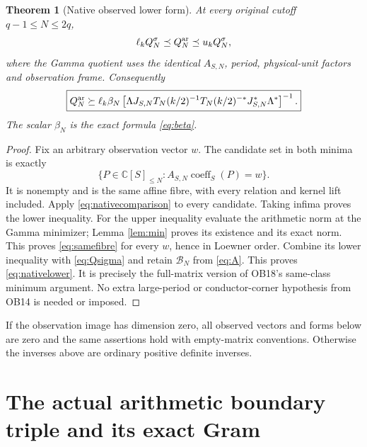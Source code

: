 \documentclass[11pt]{article}
\newtheorem{theorem}{Theorem}
\newcommand{\C}{\mathbb C}
\begin{document}
\begin{theorem}[Native observed lower form]\label{thm:nativelower}
At every original cutoff $q-1\le N\le2q$,
\begin{equation}\label{eq:samefibre}
 \ell_kQ_N^\sigma\preceq Q_N^{\rm ar}\preceq u_kQ_N^\sigma,
\end{equation}
where the Gamma quotient uses the identical $A_{S,N}$, period,
physical-unit factors and observation frame.  Consequently
\begin{equation}\label{eq:nativelower}
 \boxed{Q_N^{\rm ar}\succeq
 \ell_k\beta_N\left[
 \Lambda J_{S,N}T_N(k/2)^{-1}T_N(k/2)^{-*}J_{S,N}^*\Lambda^*
 \right]^{-1}.}
\end{equation}
The scalar $\beta_N$ is the exact formula \eqref{eq:beta}.
\end{theorem}
\begin{proof}
Fix an arbitrary observation vector $w$.  The candidate set in both
minima is exactly
\[
 \{P\in\C[S]_{\le N}:A_{S,N}\operatorname{coeff}_S(P)=w\}.
\]
It is nonempty and is the same affine fibre, with every relation and
kernel lift included.  Apply \eqref{eq:nativecomparison} to every
candidate.  Taking infima proves the lower inequality.  For the upper
inequality evaluate the arithmetic norm at the Gamma minimizer;
Lemma \ref{lem:min} proves its existence and its exact norm.  This
proves \eqref{eq:samefibre} for every $w$, hence in Loewner order.
Combine its lower inequality with \eqref{eq:Qsigma} and retain
$\mathcal B_N$ from \eqref{eq:A}.  This proves \eqref{eq:nativelower}.
It is precisely the full-matrix version of OB18's same-class minimum
argument.  No extra large-period or conductor-corner hypothesis from
OB14 is needed or imposed.
\end{proof}

If the observation image has dimension zero, all observed vectors and
forms below are zero and the same assertions hold with empty-matrix
conventions.  Otherwise the inverses above are ordinary positive
definite inverses.

\section{The actual arithmetic boundary triple and its exact Gram}
\end{document}
